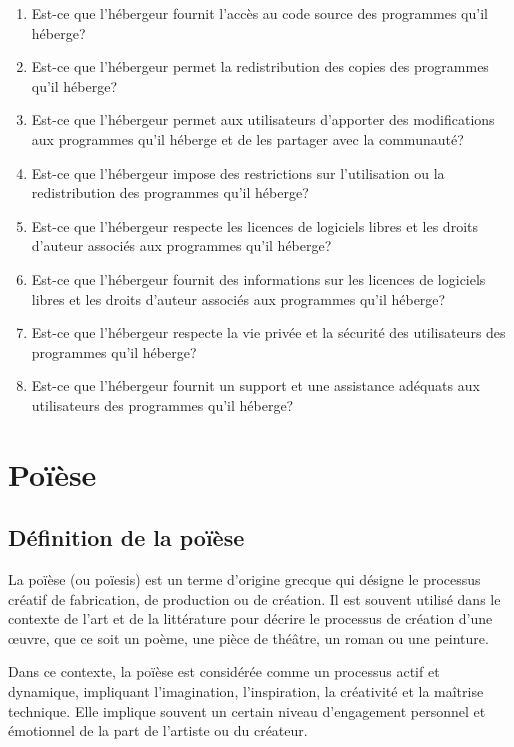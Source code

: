 \begin{enumerate}
    \item Est-ce que l'hébergeur fournit l'accès au code source des programmes qu'il héberge?
    \item Est-ce que l'hébergeur permet la redistribution des copies des programmes qu'il héberge?
    \item Est-ce que l'hébergeur permet aux utilisateurs d'apporter des modifications aux programmes qu'il héberge et de les partager avec la communauté?
    \item Est-ce que l'hébergeur impose des restrictions sur l'utilisation ou la redistribution des programmes qu'il héberge?
    \item Est-ce que l'hébergeur respecte les licences de logiciels libres et les droits d'auteur associés aux programmes qu'il héberge?
    \item Est-ce que l'hébergeur fournit des informations sur les licences de logiciels libres et les droits d'auteur associés aux programmes qu'il héberge?
    \item Est-ce que l'hébergeur respecte la vie privée et la sécurité des utilisateurs des programmes qu'il héberge?
    \item Est-ce que l'hébergeur fournit un support et une assistance adéquats aux utilisateurs des programmes qu'il héberge?
\end{enumerate}

\section{Poïèse}

\subsection{Définition de la poïèse}

La poïèse (ou poïesis) est un terme d'origine grecque qui désigne le processus créatif de fabrication, de production ou de création. Il est souvent utilisé dans le contexte de l'art et de la littérature pour décrire le processus de création d'une œuvre, que ce soit un poème, une pièce de théâtre, un roman ou une peinture.

Dans ce contexte, la poïèse est considérée comme un processus actif et dynamique, impliquant l'imagination, l'inspiration, la créativité et la maîtrise technique. Elle implique souvent un certain niveau d'engagement personnel et émotionnel de la part de l'artiste\label{poiese_artise} ou du créateur.

